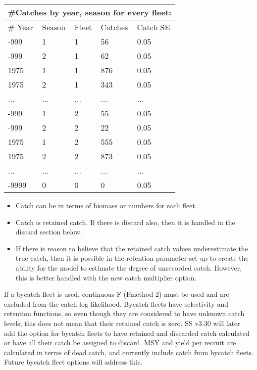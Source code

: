 \begin{center}
	\begin{tabular}{p{3cm} p{3cm} p{3cm} p{3cm} p{2cm}}
		\multicolumn{5}{l}{\#Catches by year, season for every fleet:}\\
		\hline
		\# Year & Season & Fleet & Catches & Catch SE \\
		\hline
		-999 & 1 & 1 & 56  & 0.05 \\
		-999 & 2 & 1 & 62  & 0.05 \\
		1975 & 1 & 1 & 876 & 0.05 \\
		1975 & 2 & 1 & 343 & 0.05 \\
		...  & ...   & ...   & ...   & ...  \\
		-999 & 1 & 2 & 55  & 0.05 \\
		-999 & 2 & 2 & 22  & 0.05 \\
		1975 & 1 & 2 & 555 & 0.05 \\
		1975 & 2 & 2 & 873 & 0.05 \\
		...  & ...   & ...   & ...   & ...  \\
		-9999 & 0 & 0 & 0 & 0.05 \\
		\hline
	\end{tabular}
\end{center}

\begin{itemize}
	\item Catch can be in terms of biomass or numbers for each fleet.
	\item Catch is retained catch. If there is discard also, then it is handled in the discard section below.
	\item If there is reason to believe that the retained catch values underestimate the true catch, then it is possible in the retention parameter set up to create the ability for the model to estimate the degree of unrecorded catch.  However, this is better handled with the new catch multiplier option.
\end{itemize}

If a bycatch fleet is used, continuous F (F\textunderscore method 2) must be used and are excluded from the catch log likelihood.  Bycatch fleets have selectivity and retention functions, so even though they are considered to have unknown catch levels, this does not mean that their retained catch is zero.  SS v3.30 will later add the option for bycatch fleets to have retained and discarded catch calculated or have all their catch be assigned to discard.  MSY and yield per recruit are calculated in terms of dead catch, and currently include catch from bycatch fleets. Future bycatch fleet options will address this.

